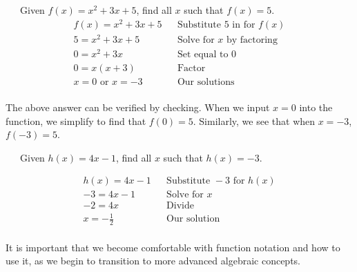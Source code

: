 \begin{example}~~~Given $f(x)=x^2+3x+5$, find all $x$ such that $f(x)=5$.
  \begin{eqnarray*}
			f (x) = x^2+3x+5 & & \text{Substitute~5~in~for~} f(x)\\
			5 = x^2+3x+5  &  & \text{Solve for~} x \text{~by~factoring}\\
			0 = x^2+3x  &  & \text{Set~equal~to~0}\\
			0 = x(x+3)  &  & \text{Factor}\\
			x=0 \text{~or~} x= -3  & & \text{Our solutions}\\
\end{eqnarray*}
\end{example}

The above answer can be verified by checking.  When we input $x=0$ into the function, we simplify to find that $f(0)=5$.  Similarly, we see that when $x=-3$, $f(-3)=5$.

\begin{example}~~~Given $h(x)=4x-1$, find all $x$ such that $h(x)=-3$.

  \begin{eqnarray*}
    h (x) = 4x-1 & & \text{Substitute~}-3 \text{~for~} h(x)\\
   -3 = 4x-1  &  & \text{Solve~for~}x\\
   -2 = 4x  &  & \text{Divide}\\
	x=-\frac{1}{2}  &  & \text{Our solution}\\
	\end{eqnarray*}
 \end{example}

It is important that we become comfortable with function notation and how to use it, as we begin to transition to more advanced algebraic concepts.

